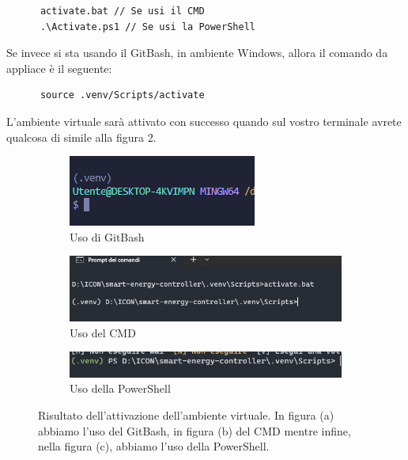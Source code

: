\documentclass[12pt, letterpaper]{article}
\begin{document}
\begin{verbatim}
      activate.bat // Se usi il CMD
      .\Activate.ps1 // Se usi la PowerShell
\end{verbatim}

\noindent Se invece si sta usando il GitBash, in ambiente Windows, allora il comando da appliace è il seguente:

\begin{verbatim}
      source .venv/Scripts/activate
\end{verbatim}

\noindent L'ambiente virtuale sarà attivato con successo quando sul vostro terminale avrete
qualcosa di simile alla figura 2.

\begin{figure}[h]
      \centering

      \vspace{0.2cm}

      \begin{subfigure}{1\textwidth}
            \centering
            \includegraphics{terminale-bash.png}
            \caption{Uso di GitBash}
      \end{subfigure}

      \vspace{0.3cm}

      \begin{subfigure}{1\textwidth}
            \centering
            \includegraphics[scale=0.8]{terminale-cmd.png}
            \caption{Uso del CMD}
      \end{subfigure}

      \vspace{0.3cm}

      \begin{subfigure}{1\textwidth}
            \centering
            \includegraphics[scale=0.8]{terminale-powershell.png}
            \caption{Uso della PowerShell}
      \end{subfigure}

      \caption{
            Risultato dell'attivazione dell'ambiente virtuale. In figura (a) abbiamo
            l'uso del GitBash, in figura (b) del CMD mentre infine, nella figura
            (c), abbiamo l'uso della PowerShell.
      }
\end{figure} \break
\end{document}
